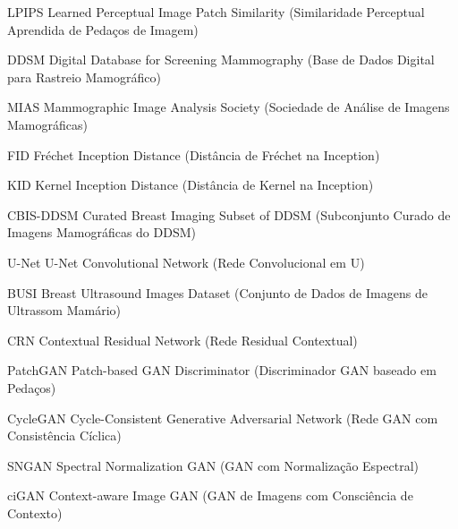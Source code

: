 \documentclass[
	12pt,				%
	openright,			%
	oneside,			%
	a4paper,			%
	tcc,			%
	]{ABNT-DC-UEL}
\begin{document}
\begin{siglas}
  \item[LPIPS] Learned Perceptual Image Patch Similarity (Similaridade Perceptual Aprendida de Pedaços de Imagem)
  \item[DDSM] Digital Database for Screening Mammography (Base de Dados Digital para Rastreio Mamográfico)
  \item[MIAS] Mammographic Image Analysis Society (Sociedade de Análise de Imagens Mamográficas)
  \item[FID] Fréchet Inception Distance (Distância de Fréchet na Inception)
  \item[KID] Kernel Inception Distance (Distância de Kernel na Inception)
  \item[CBIS-DDSM] Curated Breast Imaging Subset of DDSM (Subconjunto Curado de Imagens Mamográficas do DDSM)
  \item[U-Net] U-Net Convolutional Network (Rede Convolucional em U)
  \item[BUSI] Breast Ultrasound Images Dataset (Conjunto de Dados de Imagens de Ultrassom Mamário)
  \item[CRN] Contextual Residual Network (Rede Residual Contextual)
  \item[PatchGAN] Patch-based GAN Discriminator (Discriminador GAN baseado em Pedaços)
  \item[CycleGAN] Cycle-Consistent Generative Adversarial Network (Rede GAN com Consistência Cíclica)
  \item[SNGAN] Spectral Normalization GAN (GAN com Normalização Espectral)
  \item[ciGAN] Context-aware Image GAN (GAN de Imagens com Consciência de Contexto)
\end{siglas}



\tableofcontents*
\cleardoublepage



\textual
\pagestyle{dc-uel-header} %
\end{document}
